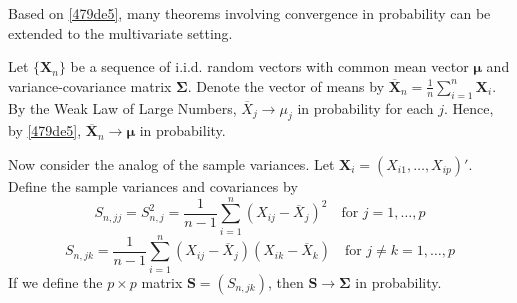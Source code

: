 Based on \cref{479de5}, many theorems involving convergence in probability can be extended to the multivariate setting.

Let $\{ \mathbf{X}_n \}$ be a sequence of i.i.d. random vectors with common mean vector $\boldsymbol{\mu}$ and variance-covariance matrix $\boldsymbol{\Sigma}$. Denote the vector of means by $\mathbf{\overline{X}}_n=\frac{1}{n}\sum_{i=1}^{n}\mathbf{X}_i$. By the Weak Law of Large Numbers, $\overline{X}_j\to \mu _j$ in probability for each $j$. Hence, by \cref{479de5}, $\overline{\mathbf{X}}_n\to \boldsymbol{\mu}$ in probability.

Now consider the analog of the sample variances. Let $\mathbf{X}_i=(X_{i1},\dots,X_{ip})'$. Define the sample variances and covariances by
\[
S_{n,jj}=S_{n,j}^{2}=\frac{1}{n-1}\sum_{i=1}^{n} (X_{ij}-\overline{X}_j)^{2}\quad \text{for }j=1,\dots,p
\]
\[
S_{n,jk}=\frac{1}{n-1}\sum_{i=1}^{n} (X_{ij}-\overline{X}_j)(X_{ik}-\overline{X}_k)\quad \text{for }j\neq k=1,\dots,p
\]
If we define the $p\times p$ matrix $\mathbf{S}=(S_{n,jk})$, then $\mathbf{S}\to\boldsymbol{\Sigma}$ in probability.

